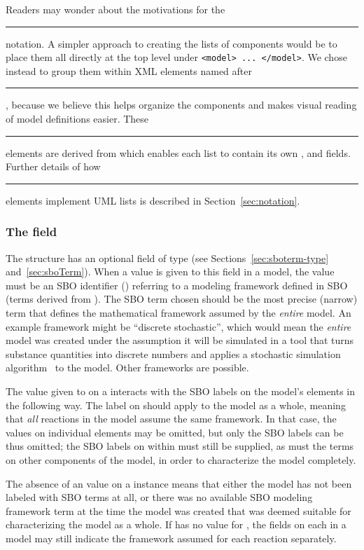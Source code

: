 Readers may wonder about the motivations for the
\rule{0.5in}{0.5pt} notation.  A simpler
approach to creating the lists of components would be to place
them all directly at the top level under \texttt{<model> ...
  </model>}.  We chose instead to group them within XML elements
named after \rule{0.5in}{0.5pt}, because we
believe this helps organize the components and makes visual
reading of model definitions easier.  These
\rule{0.5in}{0.5pt} elements are derived
from \SBase which enables each list to contain its own
,  and  fields.
Further details of how \rule{0.5in}{0.5pt}
elements implement UML lists is described in
Section~\ref{sec:notation}.


\subsubsection{The  field}
\label{sec:model-sboterm}

The \Model structure has an optional  field of type
 (see Sections~\ref{sec:sboterm-type}
and~\ref{sec:sboTerm}).  When a value is given to this field in a
model, the value must be an SBO identifier (\sboref) referring to
a modeling framework defined in SBO (\ie terms derived from
\sboframework).  The SBO term chosen should be the most precise
(narrow) term that defines the mathematical framework assumed by
the \emph{entire} model.  An example framework might be ``discrete
stochastic'', which would mean the \emph{entire} model was created
under the assumption it will be simulated in a tool that turns
substance quantities into discrete numbers and applies a
stochastic simulation algorithm~\citep[e.g.,][]{gillespie:1977} to
the model.  Other frameworks are possible.

The value given to  on a \Model interacts with the
SBO labels on the model's \Reaction elements in the following way.
The label on \Model should apply to the model as a whole, meaning
that \emph{all} reactions in the model assume the same framework.
In that case, the  values on individual \Reaction
elements may be omitted, but only the \Reaction SBO labels can be
thus omitted; the SBO labels on \KineticLaw within \Reaction must
still be supplied, as must the terms on other components of the
model, in order to characterize the model completely.

The absence of an  value on a \Model instance means
that either the model has not been labeled with SBO terms at all,
or there was no available SBO modeling framework term at the time
the model was created that was deemed suitable for characterizing
the model as a whole.  If \Model has no value for ,
the  fields on each \Reaction in a model may still
indicate the framework assumed for each reaction separately.


